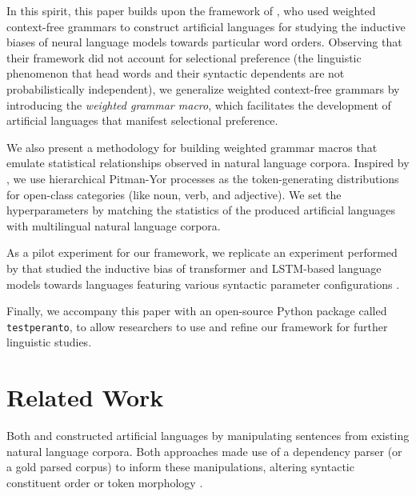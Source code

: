 \documentclass[11pt,a4paper]{article}
\begin{document}
In this spirit, this paper builds upon the framework of \citet{white-cotterell-2021-examining}, who used weighted context-free grammars to construct artificial languages for studying the inductive biases of neural language models towards particular word orders. Observing that their framework did not account for selectional preference (the linguistic  phenomenon that head words and their syntactic dependents are not probabilistically independent), we generalize weighted context-free grammars by introducing the \emph{weighted grammar macro}, which facilitates the development of artificial languages that manifest selectional preference.

We also present a methodology for building weighted grammar macros that emulate statistical relationships observed in natural language corpora. Inspired by \citet{teh-2006-hierarchical}, we use hierarchical Pitman-Yor processes \cite{pitman1997two} as the token-generating distributions for open-class categories (like noun, verb, and adjective). We set the hyperparameters by matching the statistics of the produced artificial languages with multilingual natural language corpora.

As a pilot experiment for our framework, we replicate an experiment performed by \citet{white-cotterell-2021-examining} that studied the inductive bias of transformer and LSTM-based language models towards languages featuring various syntactic parameter configurations \cite{chomsky1981principles,baker2008atoms}.

Finally, we accompany this paper with an open-source Python package called \texttt{testperanto}, to allow researchers to use and refine our framework for further linguistic studies.

\section{Related Work}

Both \citet{wang-eisner-2016-galactic} and \citet{ravfogel-etal-2019-studying} constructed artificial languages by manipulating sentences from existing natural language corpora. Both approaches made use of a dependency parser (or a gold parsed corpus) to inform these manipulations, altering syntactic constituent order \cite{wang-eisner-2016-galactic,ravfogel-etal-2019-studying} or token morphology \cite{ravfogel-etal-2019-studying}. 
\end{document}
